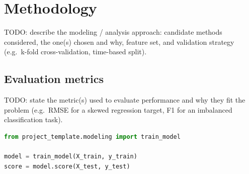 \section{Methodology}
\label{sec:methodology}

TODO: describe the modeling / analysis approach: candidate methods
considered, the one(s) chosen and why, feature set, and validation strategy
(e.g.\ k-fold cross-validation, time-based split).

\subsection{Evaluation metrics}

TODO: state the metric(s) used to evaluate performance and why they fit the
problem (e.g.\ RMSE for a skewed regression target, F1 for an imbalanced
classification task).

\begin{lstlisting}[language=Python, caption={Example: minimal training snippet}]
from project_template.modeling import train_model

model = train_model(X_train, y_train)
score = model.score(X_test, y_test)
\end{lstlisting}
